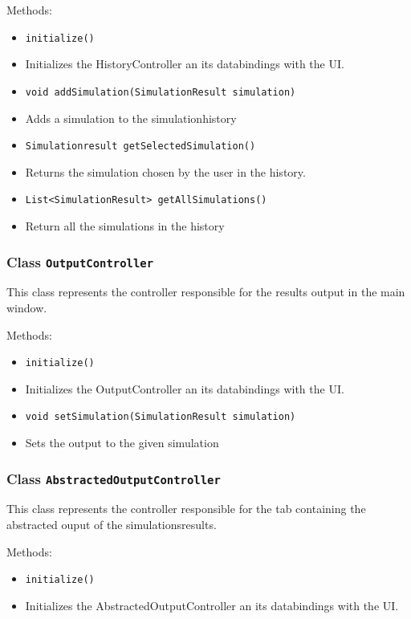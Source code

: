 \documentclass[parskip=full,11pt]{scrartcl}
\begin{document}
Methods:
\begin{itemize}\itemsep -10pt
\item \texttt{initialize()}
\item[] Initializes the HistoryController an its databindings with the UI.

\item \texttt{void addSimulation(SimulationResult simulation)}
\item[] Adds a simulation to the simulationhistory

\item \texttt{Simulationresult getSelectedSimulation()}
\item[] Returns the simulation chosen by the user in the history.

\item \texttt{List<SimulationResult> getAllSimulations()}
\item[] Return all the simulations in the history
\end{itemize}

\subsubsection{Class \texttt{OutputController}}
This class represents the controller responsible for the results output in the main window.

Methods:
\begin{itemize}\itemsep -10pt
\item \texttt{initialize()}
\item[] Initializes the OutputController an its databindings with the UI.

\item \texttt{void setSimulation(SimulationResult simulation)}
\item[] Sets the output to the given simulation

\end{itemize}

\subsubsection{Class \texttt{AbstractedOutputController}}
This class represents the controller responsible for the tab containing the abstracted ouput of the simulationsresults.

Methods:
\begin{itemize}\itemsep -10pt
\item \texttt{initialize()}
\item[] Initializes the AbstractedOutputController an its databindings with the UI.
\end{itemize}
\end{document}
